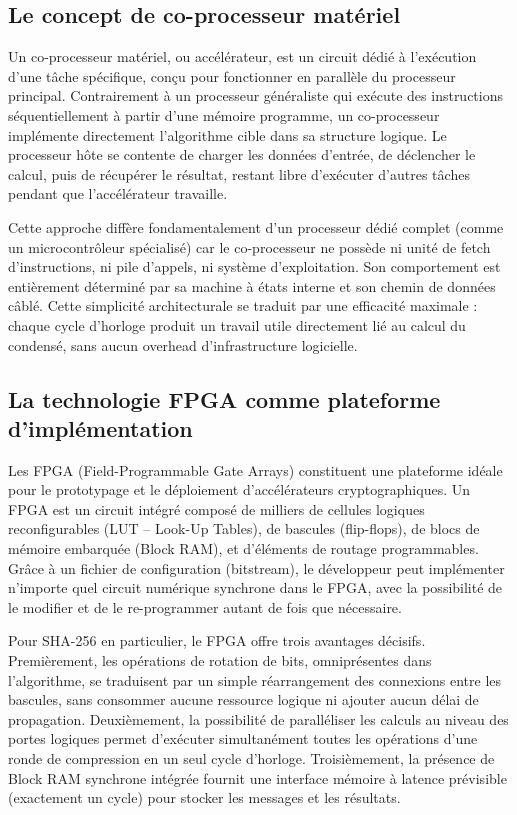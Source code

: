 \subsection{Le concept de co-processeur matériel}

Un co-processeur matériel, ou accélérateur, est un circuit dédié à l'exécution d'une tâche spécifique, conçu pour fonctionner en parallèle du processeur principal. Contrairement à un processeur généraliste qui exécute des instructions séquentiellement à partir d'une mémoire programme, un co-processeur implémente directement l'algorithme cible dans sa structure logique. Le processeur hôte se contente de charger les données d'entrée, de déclencher le calcul, puis de récupérer le résultat, restant libre d'exécuter d'autres tâches pendant que l'accélérateur travaille.

Cette approche diffère fondamentalement d'un processeur dédié complet (comme un microcontrôleur spécialisé) car le co-processeur ne possède ni unité de fetch d'instructions, ni pile d'appels, ni système d'exploitation. Son comportement est entièrement déterminé par sa machine à états interne et son chemin de données câblé. Cette simplicité architecturale se traduit par une efficacité maximale : chaque cycle d'horloge produit un travail utile directement lié au calcul du condensé, sans aucun overhead d'infrastructure logicielle.

\subsection{La technologie FPGA comme plateforme d'implémentation}

Les FPGA (Field-Programmable Gate Arrays) constituent une plateforme idéale pour le prototypage et le déploiement d'accélérateurs cryptographiques. Un FPGA est un circuit intégré composé de milliers de cellules logiques reconfigurables (LUT -- Look-Up Tables), de bascules (flip-flops), de blocs de mémoire embarquée (Block RAM), et d'éléments de routage programmables. Grâce à un fichier de configuration (bitstream), le développeur peut implémenter n'importe quel circuit numérique synchrone dans le FPGA, avec la possibilité de le modifier et de le re-programmer autant de fois que nécessaire.

Pour SHA-256 en particulier, le FPGA offre trois avantages décisifs. Premièrement, les opérations de rotation de bits, omniprésentes dans l'algorithme, se traduisent par un simple réarrangement des connexions entre les bascules, sans consommer aucune ressource logique ni ajouter aucun délai de propagation. Deuxièmement, la possibilité de paralléliser les calculs au niveau des portes logiques permet d'exécuter simultanément toutes les opérations d'une ronde de compression en un seul cycle d'horloge. Troisièmement, la présence de Block RAM synchrone intégrée fournit une interface mémoire à latence prévisible (exactement un cycle) pour stocker les messages et les résultats.

